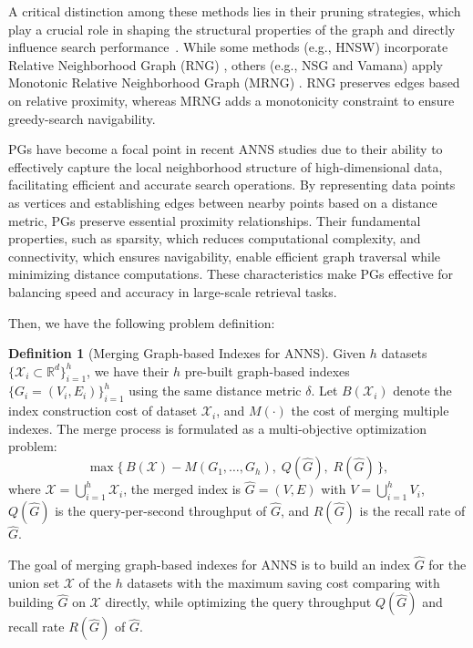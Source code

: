 \documentclass[acmsmall]{acmart}
\theoremstyle{remark}
\theoremstyle{definition}
\newtheorem{definition}{\bf Definition}
\begin{document}
A critical distinction among these methods lies in their pruning strategies, which play a crucial role in shaping the structural properties of the graph and directly influence search performance~\cite{wang2021comprehensive}. While some methods (e.g., HNSW) incorporate Relative Neighborhood Graph (RNG) \cite{toussaint1980relative}, others (e.g., NSG and Vamana) apply Monotonic Relative Neighborhood Graph (MRNG) \cite{fu2017fast}. RNG preserves edges based on relative proximity, whereas MRNG adds a monotonicity constraint to ensure greedy-search navigability.

PGs have become a focal point in recent ANNS studies \cite{wang2021comprehensive,li2019approximate,yang2024revisiting} due to their ability to effectively capture the local neighborhood structure of high-dimensional data, facilitating efficient and accurate search operations. By representing data points as vertices and establishing edges between nearby points based on a distance metric, PGs preserve essential proximity relationships. Their fundamental properties, such as sparsity, which reduces computational complexity, and connectivity, which ensures navigability, enable efficient graph traversal while minimizing distance computations. These characteristics make PGs effective for balancing speed and accuracy in large-scale retrieval tasks. 

Then, we have the following problem definition:
\begin{definition}[Merging Graph-based Indexes for ANNS]\label{def:merge_revised}
Given $h$ datasets $\{\mathcal{X}_i \subset \mathbb{R}^d\}_{i=1}^h$, we have their $h$ pre-built graph-based indexes $\{G_i=(V_i,E_i)\}_{i=1}^h$ using the same distance metric $\delta$. Let $B(\mathcal{X}_i)$ denote the index construction cost of dataset $\mathcal{X}_i$, and $M(\cdot)$ the cost of merging multiple indexes. The merge process is formulated as a multi-objective optimization problem:
$$
\max \Big\{\, B\!\left(\mathcal{X}\right) - M(G_1,\dots,G_h),\; Q(\hat{G}),\; R(\hat{G}) \,\Big\},
$$
where $\mathcal{X} = \bigcup_{i=1}^h \mathcal{X}_i$, the merged index is $\hat{G}=(V,E)$ with $V=\bigcup_{i=1}^h V_i$, $Q(\hat{G})$ is the query-per-second throughput of $\hat{G}$, and $R(\hat{G})$ is the recall rate of $\hat{G}$.
\end{definition}
The goal of merging graph-based indexes for ANNS is to build an index $\hat{G}$ for the union set $\mathcal{X}$ of the $h$ datasets with the maximum saving cost comparing with building $\hat{G}$ on $\mathcal{X}$ directly, while optimizing the query throughput $Q(\hat{G})$ and recall rate $R(\hat{G})$ of $\hat{G}$.
\end{document}

